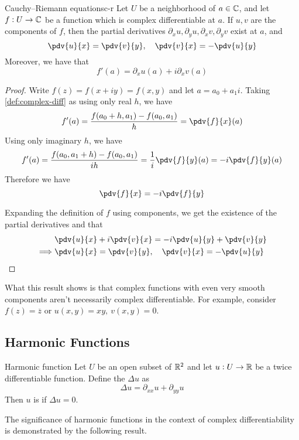\documentclass{styles/tufte}
\begin{document}
  \begin{theorem}{Cauchy--Riemann equations}{c-r}
    Let $U$ be a neighborhood of $a \in \mathbb{C}$, and let $f: U \to \mathbb{C}$ be a function which is complex differentiable at $a$. If $u, v$ are the components of $f$, then the partial derivatives $\partial_x u, \partial_y u, \partial_x v, \partial_y v$ exist at $a$, and
    \[ \pdv{u}{x} = \pdv{v}{y}, \quad \pdv{v}{x} = -\pdv{u}{y} \]
    Moreover, we have that
    \[ f'(a) = \partial_x u(a) + i\partial_x v(a) \]
  \end{theorem}
  \begin{proof}
    Write $f(z) = f(x + iy) = f(x, y)$ and let $a = a_0 + a_1i$. Taking \cref{def:complex-diff} as using only real $h$, we have
    \[ f'(a) = \frac{f(a_0 + h, a_1) - f(a_0, a_1)}{h} = {\pdv{f}{x}}(a) \]
    Using only imaginary $h$, we have
    \[ f'(a) = \frac{f(a_0, a_1 + h) - f(a_0, a_1)}{ih} = \frac{1}{i} {\pdv{f}{y}}(a) = -i {\pdv{f}{y}}(a) \]
    Therefore we have
    \[ \pdv{f}{x} = -i \pdv{f}{y} \]
    
    Expanding the definition of $f$ using components, we get the existence of the partial derivatives and that
    \begin{align*}
      &\pdv{u}{x} + i\pdv{v}{x} = -i \pdv{u}{y} + \pdv{v}{y} \\
      \implies &\pdv{u}{x} = \pdv{v}{y},\quad \pdv{v}{x} = -\pdv{u}{y} \qedhere
    \end{align*}
  \end{proof}
  
  What this result shows is that complex functions with even very smooth components aren't necessarily complex differentiable. For example, consider $f(z) = \overline{z}$ or $u(x, y) = xy,\ v(x, y) = 0$.
  
  
\subsection{Harmonic Functions}
  \begin{definition}{Harmonic function}{}
    Let $U$ be an open subset of $\mathbb{R}^2$ and let $u: U \to \mathbb{R}$ be a twice differentiable function. Define the  $\Delta u$ as
    \[ \Delta u = \partial_{xx} u + \partial_{yy} u \]
    Then $u$ is  if $\Delta u = 0$.
  \end{definition}
  
  The significance of harmonic functions in the context of complex differentiability is demonstrated by the following result.
  
\end{document}
